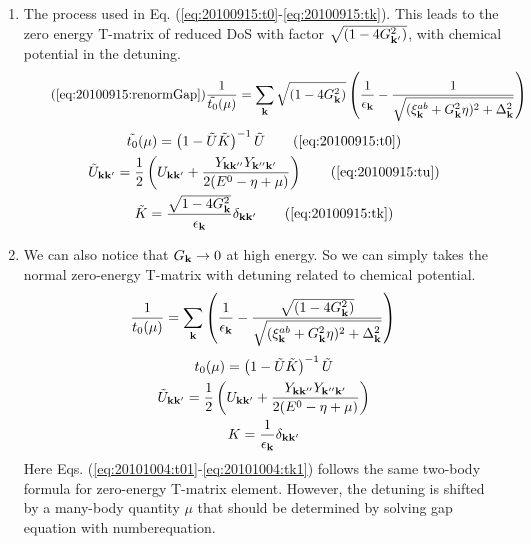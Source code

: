 \begin{enumerate}
\item The process used in Eq. (\ref{eq:20100915:t0}-\ref{eq:20100915:tk}).  This leads to the zero energy T-matrix of reduced DoS with factor $\sqrt{(1-4G_{\mathbf{k}'}^{2})}$, with chemical potential in the detuning.  
\begin{equation}\tag{\ref{eq:20100915:renormGap}}
\nth{\tilde{t_{0}}(\mu)}=\sum_{\vk}\sqrt{(1-4G_{\vk}^{2})}
\br{\nth{\epsilon_{\vk}}-\nth{\sqrt{{(\xi^{ab}_{\vk}+  G_{\vk}^2\eta)^{2}+\Delta_{\vk}^{2}}}}}
\end{equation}
\begin{gather}
\tilde{t_{0}}(\mu)=\br{1-\tilde{U}\tilde{ K}}^{-1}\tilde{U}\tag{\ref{eq:20100915:t0}}\\
\tilde{U}_{\vk\vk'}=\nth{2} \br{U_{\vk\vk'}+\frac{Y_{\vk\vk''}Y_{\vk''\vk'}}{2(E^{0}-\eta+\mu)}}\tag{\ref{eq:20100915:tu}}\\
\tilde{K}=\frac{\sqrt{1-4G_{\vk}^{2}}}{\epsilon_{\vk}}\delta_{\vk\vk'}\tag{\ref{eq:20100915:tk}}
\end{gather}
\item We can also notice that $G_{\mathbf{k}}\rightarrow0$ at high energy.  So we can simply takes the normal zero-energy T-matrix with detuning related to chemical potential.  
\begin{equation}\label{eq:20101004:renormGap1}
\frac{1}{{t_{0}}(\mu)}=\sum_{\mathbf{k}}
\left(\frac{1}{\epsilon_{\mathbf{k}}}-\frac{\sqrt{(1-4G_{\mathbf{k}}^{2})}}{\sqrt{{(\xi^{ab}_{\mathbf{k}}+  G_{\mathbf{k}}^2\eta)^{2}+\Delta_{\mathbf{k}}^{2}}}}\right)
\end{equation} 
\begin{gather}
{t_{0}}(\mu)=\left(1-\tilde{U}\tilde{ K}\right)^{-1}\tilde{U}\label{eq:20101004:t01}\\
\tilde{U}_{\mathbf{k}\mathbf{k}'}=\frac{1}{2} \left(U_{\mathbf{k}\mathbf{k}'}+\frac{Y_{\mathbf{k}\mathbf{k}''}Y_{\mathbf{k}''\mathbf{k}'}}{2(E^{0}-\eta+\mu)}\right)\label{eq:20101004:tu1}\\
{K}=\frac{1}{\epsilon_{\mathbf{k}}}\delta_{\mathbf{k}\mathbf{k}'}\label{eq:20101004:tk1}
\end{gather}
Here Eqs. (\ref{eq:20101004:t01}-\ref{eq:20101004:tk1}) follows the same two-body formula for zero-energy T-matrix element.  However, the detuning is shifted by a many-body quantity $\mu$ that should be determined by solving gap equation with numberequation.    


\end{enumerate}
